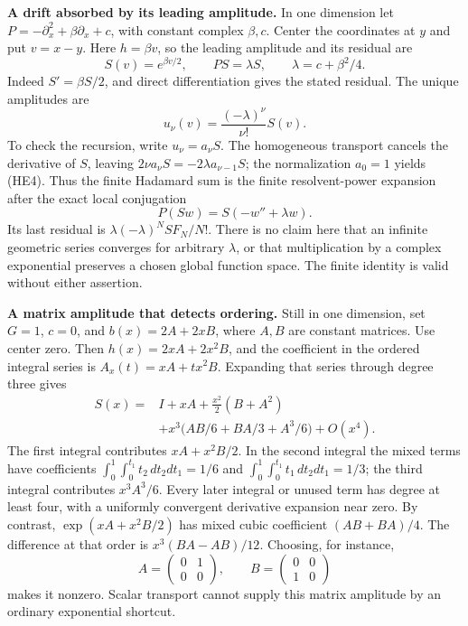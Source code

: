 \documentclass[
  11pt,
]{article}
\begin{document}
\textbf{A drift absorbed by its leading amplitude.} In one dimension let
\(P=-\partial_x^2+\beta\partial_x+c\), with constant complex
\(\beta,c\). Center the coordinates at \(y\) and put \(v=x-y\). Here
\(h=\beta v\), so the leading amplitude and its residual are \[
 S(v)=e^{\beta v/2},\qquad PS=\lambda S,
                  \qquad\lambda=c+\beta^2/4.                 \tag{HE3}
\] Indeed \(S'=\beta S/2\), and direct differentiation gives the stated
residual. The unique amplitudes are \[
                     u_\nu(v)=\frac{(-\lambda)^\nu}{\nu!}S(v).
                                                               \tag{HE4}
\] To check the recursion, write \(u_\nu=a_\nu S\). The homogeneous
transport cancels the derivative of \(S\), leaving
\(2\nu a_\nu S=-2\lambda a_{\nu-1}S\); the normalization \(a_0=1\)
yields (HE4). Thus the finite Hadamard sum is the finite resolvent-power
expansion after the exact local conjugation \[
              P(Sw)=S(-w''+\lambda w).                        \tag{HE5}
\] Its last residual is \(\lambda(-\lambda)^N S F_N/N!\). There is no
claim here that an infinite geometric series converges for arbitrary
\(\lambda\), or that multiplication by a complex exponential preserves a
chosen global function space. The finite identity is valid without
either assertion.

\textbf{A matrix amplitude that detects ordering.} Still in one
dimension, set \(G=1\), \(c=0\), and \(b(x)=2A+2xB\), where \(A,B\) are
constant matrices. Use center zero. Then \(h(x)=2xA+2x^2B\), and the
coefficient in the ordered integral series is \(A_x(t)=xA+tx^2B\).
Expanding that series through degree three gives \[
\begin{split}
 S(x)={}&I+xA+\tfrac{x^2}{2}(B+A^2)\\
       &+x^3\bigl(AB/6+BA/3+A^3/6\bigr)+O(x^4).
\end{split}             \tag{HE6}
\] The first integral contributes \(xA+x^2B/2\). In the second integral
the mixed terms have coefficients
\(\int_0^1\int_0^{t_1}t_2\,dt_2dt_1=1/6\) and
\(\int_0^1\int_0^{t_1}t_1\,dt_2dt_1=1/3\); the third integral
contributes \(x^3A^3/6\). Every later integral or unused term has degree
at least four, with a uniformly convergent derivative expansion near
zero. By contrast, \(\exp(xA+x^2B/2)\) has mixed cubic coefficient
\((AB+BA)/4\). The difference at that order is \(x^3(BA-AB)/12\).
Choosing, for instance, \[
 A=\begin{pmatrix}0&1\\0&0\end{pmatrix},\qquad
 B=\begin{pmatrix}0&0\\1&0\end{pmatrix}                       \tag{HE7}
\] makes it nonzero. Scalar transport cannot supply this matrix
amplitude by an ordinary exponential shortcut.
\end{document}
